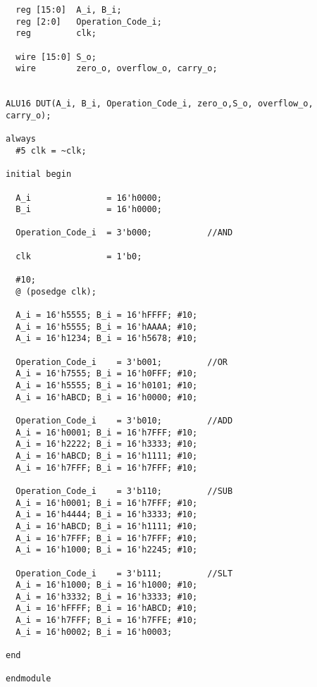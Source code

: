\documentclass[12pt]{article}
\begin{document}
{\begin{verbatim}
  reg [15:0]  A_i, B_i;
  reg [2:0]   Operation_Code_i;
  reg         clk;
  
  wire [15:0] S_o;
  wire        zero_o, overflow_o, carry_o;
    
  
ALU16 DUT(A_i, B_i, Operation_Code_i, zero_o,S_o, overflow_o, carry_o);

always
  #5 clk = ~clk;

initial begin
  
  A_i               = 16'h0000;
  B_i               = 16'h0000;
  
  Operation_Code_i  = 3'b000;           //AND
  
  clk               = 1'b0;
  
  #10;
  @ (posedge clk);
  
  A_i = 16'h5555; B_i = 16'hFFFF; #10;
  A_i = 16'h5555; B_i = 16'hAAAA; #10;
  A_i = 16'h1234; B_i = 16'h5678; #10;
  
  Operation_Code_i    = 3'b001;         //OR
  A_i = 16'h7555; B_i = 16'h0FFF; #10;
  A_i = 16'h5555; B_i = 16'h0101; #10;
  A_i = 16'hABCD; B_i = 16'h0000; #10;
      
  Operation_Code_i    = 3'b010;         //ADD
  A_i = 16'h0001; B_i = 16'h7FFF; #10;
  A_i = 16'h2222; B_i = 16'h3333; #10;
  A_i = 16'hABCD; B_i = 16'h1111; #10;
  A_i = 16'h7FFF; B_i = 16'h7FFF; #10;
       
  Operation_Code_i    = 3'b110;         //SUB
  A_i = 16'h0001; B_i = 16'h7FFF; #10;
  A_i = 16'h4444; B_i = 16'h3333; #10;
  A_i = 16'hABCD; B_i = 16'h1111; #10;
  A_i = 16'h7FFF; B_i = 16'h7FFF; #10;
  A_i = 16'h1000; B_i = 16'h2245; #10;
       
  Operation_Code_i    = 3'b111;         //SLT
  A_i = 16'h1000; B_i = 16'h1000; #10;
  A_i = 16'h3332; B_i = 16'h3333; #10;
  A_i = 16'hFFFF; B_i = 16'hABCD; #10;
  A_i = 16'h7FFF; B_i = 16'h7FFE; #10;
  A_i = 16'h0002; B_i = 16'h0003;
     
end

endmodule
    \end{verbatim}
    }
\end{document}

